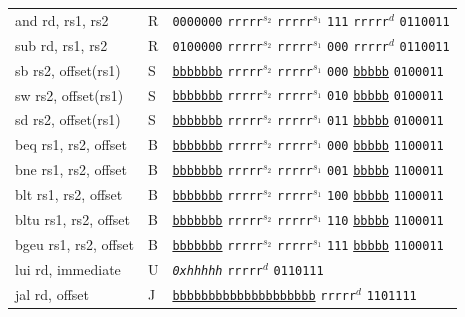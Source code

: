 \documentclass[a4paper,12pt,final]{article}
\begin{document}
\begin{table}[!htbp]
\begin{adjustwidth}{-1cm}{-1cm}
\begin{center}
\begin{tabular}{lll}
and rd, rs1, rs2 & R & \texttt{0000000} \texttt{rrrrr}​\(^{s_{2}}\) \texttt{rrrrr}​\(^{s_{1}}\) \texttt{111} \texttt{rrrrr}​\(^{d}\)  \texttt{0110011}\\[0pt]
sub rd, rs1, rs2 & R & \texttt{0100000} \texttt{rrrrr}​\(^{s_{2}}\) \texttt{rrrrr}​\(^{s_{1}}\) \texttt{000} \texttt{rrrrr}​\(^{d}\)  \texttt{0110011}\\[0pt]
\hline
sb rs2, offset(rs1) & S & \uline{\texttt{bbbbbbb}} \texttt{rrrrr}​\(^{s_{2}}\) \texttt{rrrrr}​\(^{s_{1}}\) \texttt{000} \uline{\texttt{bbbbb}} \texttt{0100011}\\[0pt]
sw rs2, offset(rs1) & S & \uline{\texttt{bbbbbbb}} \texttt{rrrrr}​\(^{s_{2}}\) \texttt{rrrrr}​\(^{s_{1}}\) \texttt{010} \uline{\texttt{bbbbb}} \texttt{0100011}\\[0pt]
sd rs2, offset(rs1) & S & \uline{\texttt{bbbbbbb}} \texttt{rrrrr}​\(^{s_{2}}\) \texttt{rrrrr}​\(^{s_{1}}\) \texttt{011} \uline{\texttt{bbbbb}} \texttt{0100011}\\[0pt]
\hline
beq rs1, rs2, offset & B & \uline{\texttt{bbbbbbb}} \texttt{rrrrr}​\(^{s_{2}}\) \texttt{rrrrr}​\(^{s_{1}}\) \texttt{000} \uline{\texttt{bbbbb}} \texttt{1100011}\\[0pt]
bne rs1, rs2, offset & B & \uline{\texttt{bbbbbbb}} \texttt{rrrrr}​\(^{s_{2}}\) \texttt{rrrrr}​\(^{s_{1}}\) \texttt{001} \uline{\texttt{bbbbb}} \texttt{1100011}\\[0pt]
blt rs1, rs2, offset & B & \uline{\texttt{bbbbbbb}} \texttt{rrrrr}​\(^{s_{2}}\) \texttt{rrrrr}​\(^{s_{1}}\) \texttt{100} \uline{\texttt{bbbbb}} \texttt{1100011}\\[0pt]
bltu rs1, rs2, offset & B & \uline{\texttt{bbbbbbb}} \texttt{rrrrr}​\(^{s_{2}}\) \texttt{rrrrr}​\(^{s_{1}}\) \texttt{110} \uline{\texttt{bbbbb}} \texttt{1100011}\\[0pt]
bgeu rs1, rs2, offset & B & \uline{\texttt{bbbbbbb}} \texttt{rrrrr}​\(^{s_{2}}\) \texttt{rrrrr}​\(^{s_{1}}\) \texttt{111} \uline{\texttt{bbbbb}} \texttt{1100011}\\[0pt]
\hline
lui rd, immediate & U & \emph{\texttt{0xhhhhh}}                                                  \texttt{rrrrr}​\(^{d}\)  \texttt{0110111}\\[0pt]
\hline
jal rd, offset & J & \uline{\texttt{bbbbbbbbbbbbbbbbbbbb}}                                     \texttt{rrrrr}​\(^{d}\)  \texttt{1101111}\\[0pt]
\end{tabular}

\end{center}
\normalsize \end{adjustwidth} \end{table} \vspace{0}
\end{document}
